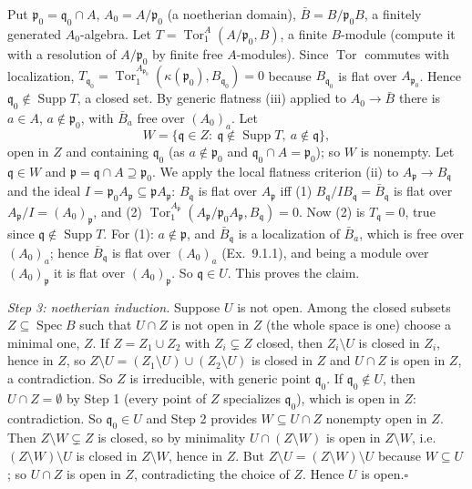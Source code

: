 \documentclass[11pt]{article}
\begin{document}
Put $\mathfrak p_0=\mathfrak q_0\cap A$, $A_0=A/\mathfrak p_0$ (a noetherian domain), $\bar B=B/\mathfrak p_0B$, a finitely generated $A_0$-algebra. Let $T=\operatorname{Tor}_1^A(A/\mathfrak p_0,B)$, a finite $B$-module (compute it with a resolution of $A/\mathfrak p_0$ by finite free $A$-modules). Since $\operatorname{Tor}$ commutes with localization, $T_{\mathfrak q_0}=\operatorname{Tor}_1^{A_{\mathfrak p_0}}(\kappa(\mathfrak p_0),B_{\mathfrak q_0})=0$ because $B_{\mathfrak q_0}$ is flat over $A_{\mathfrak p_0}$. Hence $\mathfrak q_0\notin\operatorname{Supp}T$, a closed set. By generic flatness (iii) applied to $A_0\to\bar B$ there is $a\in A$, $a\notin\mathfrak p_0$, with $\bar B_a$ free over $(A_0)_a$. Let
\[
W=\{\mathfrak q\in Z:\ \mathfrak q\notin\operatorname{Supp}T,\ a\notin\mathfrak q\},
\]
open in $Z$ and containing $\mathfrak q_0$ (as $a\notin\mathfrak p_0$ and $\mathfrak q_0\cap A=\mathfrak p_0$); so $W$ is nonempty. Let $\mathfrak q\in W$ and $\mathfrak p=\mathfrak q\cap A\supseteq\mathfrak p_0$. We apply the local flatness criterion (ii) to $A_{\mathfrak p}\to B_{\mathfrak q}$ and the ideal $I=\mathfrak p_0A_{\mathfrak p}\subseteq\mathfrak pA_{\mathfrak p}$: $B_{\mathfrak q}$ is flat over $A_{\mathfrak p}$ iff (1) $B_{\mathfrak q}/IB_{\mathfrak q}=\bar B_{\mathfrak q}$ is flat over $A_{\mathfrak p}/I=(A_0)_{\mathfrak p}$, and (2) $\operatorname{Tor}_1^{A_{\mathfrak p}}(A_{\mathfrak p}/\mathfrak p_0A_{\mathfrak p},B_{\mathfrak q})=0$. Now (2) is $T_{\mathfrak q}=0$, true since $\mathfrak q\notin\operatorname{Supp}T$. For (1): $a\notin\mathfrak p$, and $\bar B_{\mathfrak q}$ is a localization of $\bar B_a$, which is free over $(A_0)_a$; hence $\bar B_{\mathfrak q}$ is flat over $(A_0)_a$ (Ex.~9.1.1), and being a module over $(A_0)_{\mathfrak p}$ it is flat over $(A_0)_{\mathfrak p}$. So $\mathfrak q\in U$. This proves the claim.

\emph{Step 3: noetherian induction.} Suppose $U$ is not open. Among the closed subsets $Z\subseteq\operatorname{Spec}B$ such that $U\cap Z$ is not open in $Z$ (the whole space is one) choose a minimal one, $Z$. If $Z=Z_1\cup Z_2$ with $Z_i\subsetneq Z$ closed, then $Z_i\setminus U$ is closed in $Z_i$, hence in $Z$, so $Z\setminus U=(Z_1\setminus U)\cup(Z_2\setminus U)$ is closed in $Z$ and $U\cap Z$ is open in $Z$, a contradiction. So $Z$ is irreducible, with generic point $\mathfrak q_0$. If $\mathfrak q_0\notin U$, then $U\cap Z=\emptyset$ by Step 1 (every point of $Z$ specializes $\mathfrak q_0$), which is open in $Z$: contradiction. So $\mathfrak q_0\in U$ and Step 2 provides $W\subseteq U\cap Z$ nonempty open in $Z$. Then $Z\setminus W\subsetneq Z$ is closed, so by minimality $U\cap(Z\setminus W)$ is open in $Z\setminus W$, i.e.\ $(Z\setminus W)\setminus U$ is closed in $Z\setminus W$, hence in $Z$. But $Z\setminus U=(Z\setminus W)\setminus U$ because $W\subseteq U$; so $U\cap Z$ is open in $Z$, contradicting the choice of $Z$. Hence $U$ is open.\hfill$\square$
\end{document}
